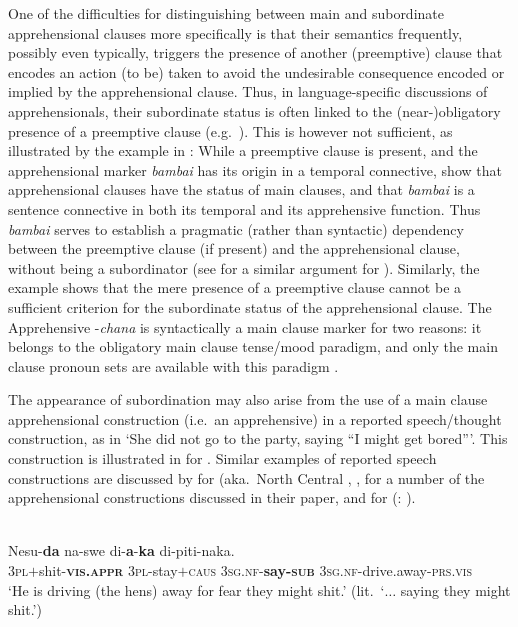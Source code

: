 \documentclass[output=paper,colorlinks,citecolor=brown]{langscibook}
\begin{document}
One of the difficulties for distinguishing between main and subordinate apprehensional clauses more specifically is that their semantics frequently, possibly even typically, triggers the presence of another (preemptive) clause that encodes an action (to be) taken to avoid the undesirable consequence encoded or implied by the apprehensional clause. Thus, in language-specific discussions of apprehensionals, their subordinate status is often linked to the (near-)obligatory presence of a preemptive clause (e.g.\ \cite{smithdennis2021}). This is however not sufficient, as illustrated by the  example in : While a preemptive clause is present, and the apprehensional marker \textit{bambai} has its origin in a temporal connective, \citet{angeloschultzeberndt2016} show that  apprehensional clauses have the status of main clauses, and that \textit{bambai} is a sentence connective in both its temporal and its apprehensive function. Thus \textit{bambai} serves to establish a pragmatic (rather than syntactic) dependency between the preemptive clause (if present) and the apprehensional clause, without being a subordinator (see \citealt{chapters/francois} for a similar argument for ). Similarly, the  example  shows that the mere presence of a preemptive clause cannot be a sufficient criterion for the subordinate status of the apprehensional clause. The  Apprehensive \nobreakdash-\textit{chana} is syntactically a main clause marker for two reasons: it belongs to the obligatory main clause tense/mood paradigm, and only the main clause pronoun sets are available with this paradigm \citep[267--268]{vuillermet2018a}.

The appearance of subordination may also arise from the use of a main clause apprehensional construction (i.e.\ an apprehensive) in a reported speech\slash thought construction, as in `She did not go to the party, saying ``I might get bored'''. This construction is illustrated in  for . Similar examples of reported speech constructions are discussed by  \citet{chapters/daniel} for  (aka.\ North Central , ,  \citet{chapters/rhee-kuteva} for a number of the  apprehensional constructions discussed in their paper, and \citet[1170]{jacques2021} for  (: ).

\ea \label{ex:intro9} 
\\
\gll {\ob}Nesu-\textbf{da} na-swe di-\textbf{a}-\textbf{ka}{\cb} di-piti-naka. \\
\textsc{3pl}$+$shit-\textsc{\textbf{vis.appr}} \textsc{3pl-}stay$+$\textsc{caus} \textsc{3sg.nf-}\textbf{say-\textsc{sub}} \textsc{3sg.nf-}drive.away-\textsc{prs.vis} \\
\glt `He is driving (the hens) away for fear they might shit.' (lit.\  `$\ldots$ saying they might shit.')
\z
\end{document}
